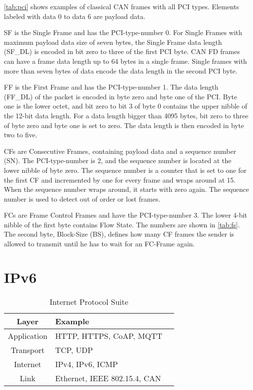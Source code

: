 \autoref{tab:pci} shows examples of classical CAN frames with all PCI types.
Elements labeled with data 0 to data 6 are payload data.

\newpage

SF is the Single Frame and has the PCI-type-number 0.
For Single Frames with maximum payload data size of seven bytes, the Single Frame data length (SF\_DL) is encoded in bit zero to three of the first PCI byte.
CAN FD frames can have a frame data length up to 64 bytes in a single frame. Single frames with more than seven bytes of data encode the data length in the second PCI byte.

FF is the First Frame and has the PCI-type-number 1.
The data length (FF\_DL) of the packet is encoded in byte zero and byte one of the PCI.
Byte one is the lower octet, and bit zero to bit 3 of byte 0 contains the upper nibble of the 12-bit data length.
For a data length bigger than 4095 bytes, bit zero to three of byte zero and byte one is set to zero.
The data length is then encoded in byte two to five.

CFs are Consecutive Frames, containing payload data and a sequence number (SN).
The PCI-type-number is 2, and the sequence number is located at the lower nibble of byte zero.
The sequence number is a counter that is set to one for the first CF and incremented by one for every frame and wraps around at 15.
When the sequence number wraps around, it starts with zero again.
The sequence number is used to detect out of order or lost frames.

FCs are Frame Control Frames and have the PCI-type-number 3.
The lower 4-bit nibble of the first byte contains Flow State. The numbers are shown in \autoref{tab:fs}.
The second byte, Block-Size (BS), defines how many CF frames the sender is allowed to transmit until he has to wait for an FC-Frame again.

\FloatBarrier

\section{IPv6}
\label{sec:ipv6}

\begin{table}
	\centering
	\caption{Internet Protocol Suite}
	\begin{tabular}{|c|l|l|} \hline
	Layer                         & Example                      \\ \hline \hline
	Application                   & HTTP, HTTPS, CoAP, MQTT      \\ \hline
	Transport                     & TCP, UDP                     \\ \hline
	\cellcolor{black!10} Internet & IPv4, IPv6, ICMP             \\ \hline
	Link                          & Ethernet, IEEE 802.15.4, CAN \\ \hline
	\end{tabular}
	\label{tab:ips}
\end{table}

